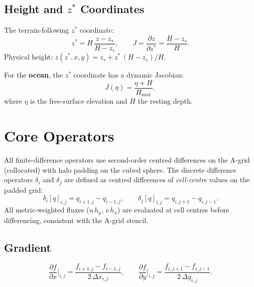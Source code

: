\documentclass[11pt,a4paper]{article}
\newcommand{\pp}{\partial}
\begin{document}
\subsection{Height and $z^*$ Coordinates}

The terrain-following $z^*$ coordinate:
\begin{equation}
  z^* = H\,\frac{z-z_s}{H-z_s}, \qquad J=\frac{\pp z}{\pp z^*}=\frac{H-z_s}{H}.
\end{equation}
Physical height: $z(z^*,x,y)=z_s+z^*\,(H-z_s)/H$.

For the \textbf{ocean}, the $z^*$ coordinate has a dynamic Jacobian:
\begin{equation}
  J(\eta) = \frac{\eta+H}{H_{\max}},
\end{equation}
where $\eta$ is the free-surface elevation and $H$ the resting depth.

\section{Core Operators}

All finite-difference operators use second-order centred differences on the A-grid (collocated) with halo padding on the cubed sphere.  The discrete difference operators $\delta_i$ and $\delta_j$ are defined as centred differences of \emph{cell-centre} values on the padded grid:
\begin{equation}
  \delta_i[q]_{i,j} = q_{i+1,j}-q_{i-1,j}, \qquad \delta_j[q]_{i,j} = q_{i,j+1}-q_{i,j-1}.
\end{equation}
All metric-weighted fluxes ($u\,h_y$, $v\,h_x$) are evaluated at cell centres before differencing, consistent with the A-grid stencil.

\subsection{Gradient}
\begin{equation}
  \frac{\pp f}{\pp x}\bigg|_{i,j}=\frac{f_{i+1,j}-f_{i-1,j}}{2\,\Delta x_{i,j}},
  \qquad
  \frac{\pp f}{\pp y}\bigg|_{i,j}=\frac{f_{i,j+1}-f_{i,j-1}}{2\,\Delta y_{i,j}}.
\end{equation}
\end{document}
